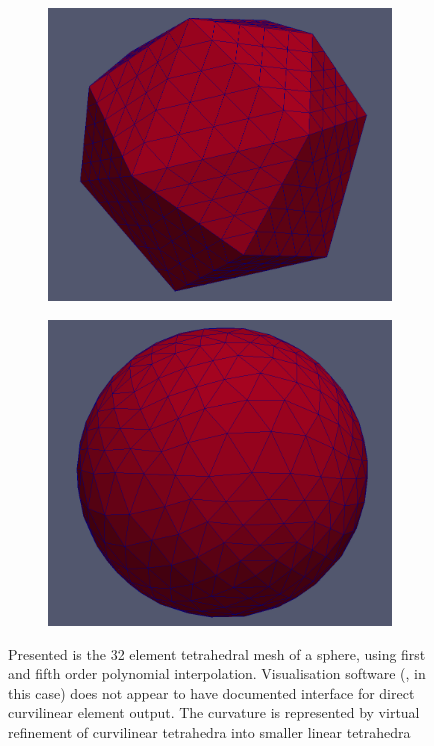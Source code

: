 \begin{figure}
    \centering
	\begin{subfigure}[b]{0.48\textwidth} \hspace{8mm} \includegraphics[scale=0.215]{images/sphere32discr6ord1} \end{subfigure}
	\begin{subfigure}[b]{0.48\textwidth} \includegraphics[scale=0.2]{images/sphere32discr6ord5} \end{subfigure}
	\captionsetup{width=0.8\textwidth} 
	\caption{Presented is the 32 element tetrahedral mesh of a sphere, using first and fifth order polynomial interpolation. Visualisation software (\ParaView{}, in this case) does not appear to have documented interface for direct curvilinear element output. The curvature is represented by virtual refinement of curvilinear tetrahedra into smaller linear tetrahedra }
	\label{fig:result:spherecurv}
\end{figure}

